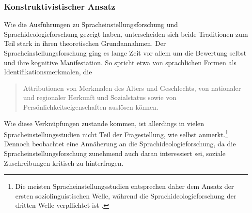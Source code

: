\subsubsection{Konstruktivistischer Ansatz}
\label{sec:Konstruktivismus}
Wie die Ausführungen zu Spracheinstellungsforschung und Sprachideologieforschung gezeigt haben, unterscheiden sich beide Traditionen zum Teil stark in ihren theoretischen Grundannahmen. 
Der Spracheinstellungsforschung ging es lange Zeit vor allem um die Bewertung selbst und ihre kognitive Manifestation.
So spricht etwa \citeauthor{Neuland.1993} von sprachlichen Formen als Identifikationsmerkmalen, die 
\begin{quote} Attributionen von Merkmalen des Alters und Geschlechts, von nationaler und regionaler Herkunft und Sozialstatus sowie von Pers{\"o}nlichkeitseigenschaften ausl{\"o}sen k{\"o}nnen. \citep[730]{Neuland.1993} \end{quote}
Wie diese Verkn{\"u}pfungen zustande kommen, ist allerdings in vielen Spracheinstellungsstudien nicht Teil der Fragestellung, wie \citet[730]{Neuland.1993} selbst anmerkt.\footnote{Die meisten Spracheinstellungsstudien entsprechen daher dem Ansatz der ersten soziolinguistischen Welle, während die Sprachideologieforschung der dritten Welle verpflichtet ist \citep[s.][]{Eckert2012}.}  
Dennoch beobachtet \citet[120]{Garrett.2007} eine Annäherung an die Sprachideologieforschung, da die Spracheinstellungsforschung zunehmend auch daran interessiert sei, soziale Zuschreibungen kritisch zu hinterfragen.

